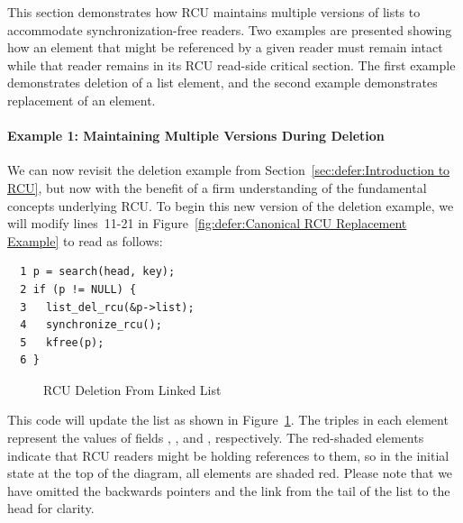 This section demonstrates how RCU maintains multiple versions of
lists to accommodate synchronization-free readers.
Two examples are presented showing how an element
that might be referenced by a given reader must remain intact
while that reader remains in its RCU read-side critical section.
The first example demonstrates deletion of a list element,
and the second example demonstrates replacement of an element.

\paragraph{Example 1: Maintaining Multiple Versions During Deletion}
\label{sec:defer:Example 1: Maintaining Multiple Versions During Deletion}

We can now revisit the deletion example from
Section~\ref{sec:defer:Introduction to RCU},
but now with the benefit of a firm understanding of the fundamental
concepts underlying RCU.
To begin this new version of the deletion example,
we will modify lines~11-21 in
Figure~\ref{fig:defer:Canonical RCU Replacement Example}
to read as follows:

\vspace{5pt}
\begin{minipage}[t]{\columnwidth}
\scriptsize
\begin{verbatim}
  1 p = search(head, key);
  2 if (p != NULL) {
  3   list_del_rcu(&p->list);
  4   synchronize_rcu();
  5   kfree(p);
  6 }
\end{verbatim}
\end{minipage}
\vspace{5pt}

\begin{figure}[tb]
\begin{center}
\end{center}
\caption{RCU Deletion From Linked List}
\label{fig:defer:RCU Deletion From Linked List}
\end{figure}

This code will update the list as shown in
Figure~\ref{fig:defer:RCU Deletion From Linked List}.
The triples in each element represent the values of fields ,
, and , respectively.
The red-shaded elements
indicate that RCU readers might be holding references to them,
so in the initial state at the top of the diagram, all elements
are shaded red.
Please note that
we have omitted the backwards pointers and the link from the tail
of the list to the head for clarity.

